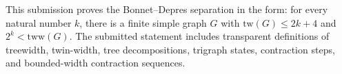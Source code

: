 This submission proves the Bonnet--Depres separation in the form: for every natural number $k$, there is a finite simple graph $G$ with $\mathrm{tw}(G)\le 2k+4$ and $2^k<\mathrm{tww}(G)$. The submitted statement includes transparent definitions of treewidth, twin-width, tree decompositions, trigraph states, contraction steps, and bounded-width contraction sequences.
